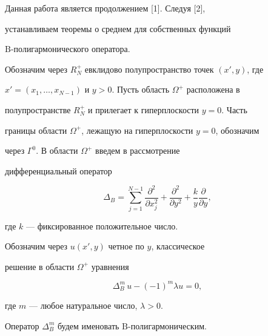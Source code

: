 




\maketitle


\label{begin}





Данная работа является продолжением [1]. Следуя [2],


устанавливаем теоремы о среднем для собственных функций


$\mathrm B$-полигармонического оператора.





Обозначим через $R^+_N$ евклидово полупространство точек $(x',y)$, где


$x'=(x_1,\dotsc,x_{N{-}1})$ и $y>0$. Пусть область $\Omega^+$ расположена в


полупространстве $R^+_N$ и прилегает к гиперплоскости $y=0$. Часть


границы области $\Omega^+$, лежащую на гиперплоскости $y=0$, обозначим


через $\Gamma^0$. В области $\Omega^+$ введем в рассмотрение


дифференциальный оператор


$$


\Delta_B=\sum_{j=1}^{N-1}\frac{\partial^2}{\partial x_j^2}+


\frac{\partial^2}{\partial y^2}+\frac{k}{y}\frac{\partial}{\partial y},


$$


где $k$ --- фиксированное положительное число.





Обозначим через $u(x',y)$ четное по $y$, классическое


решение в области $\Omega^+$ уравнения


\begin{equation}


\Delta^m_B\,u-(-1)^m\lambda u=0,


\end{equation}


где $m$ --- любое натуральное число, $\lambda>0$.


Оператор $\Delta^m_B$ будем именовать $\mathrm B$-полигармоническим.





